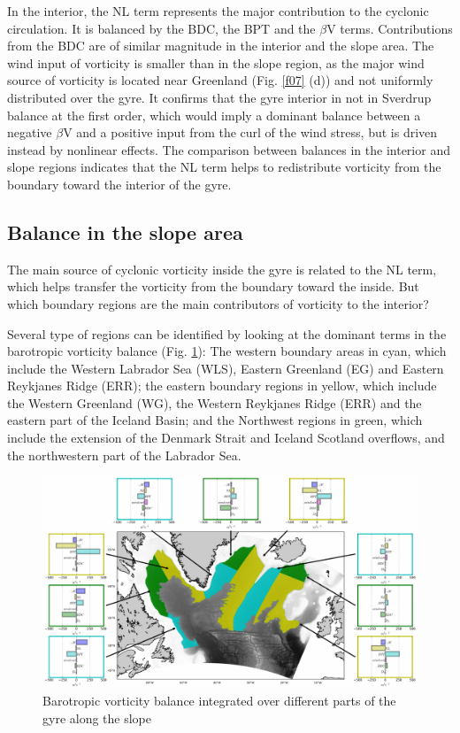 \documentclass[os, manuscript]{copernicus}
\begin{document}
In the interior, the NL term represents the major contribution to the cyclonic circulation. It is balanced by the BDC, the BPT and the $\beta$V terms. Contributions from the BDC are of similar magnitude in the interior and the slope area. The wind input of vorticity is smaller than in the slope region, as the major wind source of vorticity is located near Greenland (Fig. \ref{f07} (d)) and not uniformly distributed over the gyre. It confirms that the gyre interior in not in Sverdrup balance at the first order, which would imply a dominant balance between a negative $\beta$V and a positive input from the curl of the wind stress, but is driven instead by nonlinear effects. The comparison between balances in the interior and slope regions indicates that the NL term helps to redistribute vorticity from the boundary toward the interior of the gyre. 

\subsection{Balance in the slope area}

The main source of cyclonic vorticity inside the gyre is related to the NL term, which helps transfer the vorticity from the boundary toward the inside. But which boundary regions are the main contributors of vorticity to the interior? 

Several type of regions can be identified by looking at the dominant terms in the barotropic vorticity balance  (Fig. \ref{f11}): The western boundary areas in cyan, which include the Western Labrador Sea (WLS), Eastern Greenland (EG) and Eastern Reykjanes Ridge (ERR); the eastern boundary regions in yellow, which include the Western Greenland (WG), the Western Reykjanes Ridge (ERR) and the eastern part of the Iceland Basin; and the Northwest regions in green, which include the extension of the Denmark Strait and Iceland Scotland overflows, and the northwestern part of the Labrador Sea.

\begin{figure}[t]
\includegraphics[width=15cm]{../fig_os/f11.pdf}
\caption{Barotropic vorticity balance integrated over different parts of the gyre along the slope}
\label{f11}
\end{figure}
\end{document}
